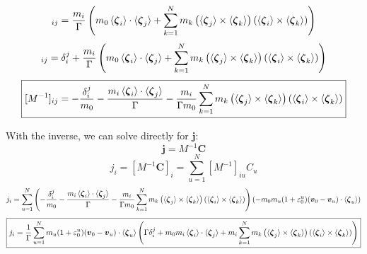 \documentclass[10pt]{report}
\begin{document}
\begin{equation}[DE(m_0I_2-E^TDE)^{-1}E^T]_{ij}=\frac{m_i}{\Gamma}\left(m_0\braket{\boldsymbol{\zeta}_i}\cdot\braket{\boldsymbol{\zeta}_j}+\sum_{k=1}^Nm_k\left(\braket{\boldsymbol{\zeta}_j}\times\braket{\boldsymbol{\zeta}_k}\right)\left(\braket{\boldsymbol{\zeta}_i}\times\braket{\boldsymbol{\zeta}_k}\right)\right)\end{equation}
\begin{equation}[I+DE(m_0I_2-E^TDE)^{-1}E^T]_{ij}=\delta_i^j+\frac{m_i}{\Gamma}\left(m_0\braket{\boldsymbol{\zeta}_i}\cdot\braket{\boldsymbol{\zeta}_j}+\sum_{k=1}^Nm_k\left(\braket{\boldsymbol{\zeta}_j}\times\braket{\boldsymbol{\zeta}_k}\right)\left(\braket{\boldsymbol{\zeta}_i}\times\braket{\boldsymbol{\zeta}_k}\right)\right)\end{equation}
\begin{equation}\boxed{[M^{-1}]_{ij}=-\frac{\delta_i^j}{m_0}-\frac{m_i\braket{\boldsymbol{\zeta}_i}\cdot\braket{\boldsymbol{\zeta}_j}}{\Gamma}-\frac{m_i}{\Gamma m_0}\sum_{k=1}^Nm_k\left(\braket{\boldsymbol{\zeta}_j}\times\braket{\boldsymbol{\zeta}_k}\right)\left(\braket{\boldsymbol{\zeta}_i}\times\braket{\boldsymbol{\zeta}_k}\right)}\end{equation}

\noindent With the inverse, we can solve directly for $\boldsymbol{j}$:
\begin{equation}\boldsymbol{j}=M^{-1}\boldsymbol{C}\end{equation}
\begin{equation}j_i=[M^{-1}\boldsymbol{C}]_i=\sum_{u=1}^N[M^{-1}]_{iu}C_u\end{equation}
\begin{equation}j_i=\sum_{u=1}^N\left(-\frac{\delta_i^j}{m_0}-\frac{m_i\braket{\boldsymbol{\zeta}_i}\cdot\braket{\boldsymbol{\zeta}_j}}{\Gamma}-\frac{m_i}{\Gamma m_0}\sum_{k=1}^Nm_k\left(\braket{\boldsymbol{\zeta}_j}\times\braket{\boldsymbol{\zeta}_k}\right)\left(\braket{\boldsymbol{\zeta}_i}\times\braket{\boldsymbol{\zeta}_k}\right)\right)\left(-m_0m_u(1+\varepsilon_0^u)(\boldsymbol{v}_0-\boldsymbol{v}_u)\cdot\braket{\boldsymbol{\zeta}_u}\right)\end{equation}
\begin{equation}\boxed{j_i=\frac{1}{\Gamma}\sum_{u=1}^Nm_u(1+\varepsilon_0^u)(\boldsymbol{v}_0-\boldsymbol{v}_u)\cdot\braket{\boldsymbol{\zeta}_u}\left(\Gamma\delta_i^j+m_0m_i\braket{\boldsymbol{\zeta}_i}\cdot\braket{\boldsymbol{\zeta}_j}+m_i\sum_{k=1}^Nm_k\left(\braket{\boldsymbol{\zeta}_j}\times\braket{\boldsymbol{\zeta}_k}\right)\left(\braket{\boldsymbol{\zeta}_i}\times\braket{\boldsymbol{\zeta}_k}\right)\right)}\end{equation}
\end{document}
